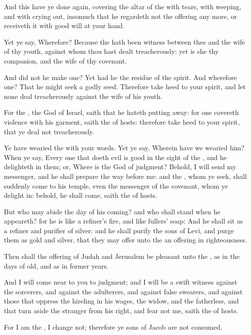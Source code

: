 \Verse And this have ye done again, covering the altar of the \LORD with tears, with weeping, and with crying out, insomuch that he regardeth not the offering any more, or receiveth it with good will at your hand.

\Verse Yet ye say, Wherefore? Because the \LORD hath been witness between thee and the wife of thy youth, against whom thou hast dealt treacherously: yet is she thy companion, and the wife of thy covenant.

\Verse And did not he make one? Yet had he the residue of the spirit.  And wherefore one? That he might seek a godly seed. Therefore take heed to your spirit, and let none deal treacherously against the wife of his youth.

\Verse For the \LORD, the God of Israel, saith that he hateth putting away: for one covereth violence with his garment, saith the \LORD of hosts: therefore take heed to your spirit, that ye deal not treacherously.

\Verse Ye have wearied the \LORD with your words. Yet ye say, Wherein have we wearied him? When ye say, Every one that doeth evil is good in the sight of the \LORD, and he delighteth in them; or, Where is the God of judgment?  
\Chapter
\Verse Behold, I will send my messenger, and he shall prepare the way before me: and the \LORD, whom ye seek, shall suddenly come to his temple, even the messenger of the covenant, whom ye delight in: behold, he shall come, saith the \LORD of hosts.

\Verse But who may abide the day of his coming? and who shall stand when he appeareth? for he is like a refiner's fire, and like fullers' soap: \Verse And he shall sit as a refiner and purifier of silver: and he shall purify the sons of Levi, and purge them as gold and silver, that they may offer unto the \LORD an offering in righteousness.

\Verse Then shall the offering of Judah and Jerusalem be pleasant unto the \LORD, as in the days of old, and as in former years.

\Verse And I will come near to you to judgment; and I will be a swift witness against the sorcerers, and against the adulterers, and against false swearers, and against those that oppress the hireling in his wages, the widow, and the fatherless, and that turn aside the stranger from his right, and fear not me, saith the \LORD of hosts.

\Verse For I am the \LORD, I change not; therefore ye sons of Jacob are not consumed.


